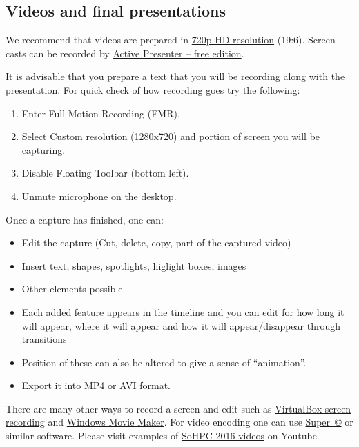 \documentclass[a4paper, twoside]{article}
\begin{document}
\begin{multicols}{3}
\section*{Videos and final presentations}
We recommend that videos are prepared in \href{https://support.google.com/youtube/answer/1722171}{720p HD resolution} (19:6). Screen casts can be recorded by \href{http://atomisystems.com/activepresenter/free-edition/}{Active Presenter --  free edition}.

It is advisable that you prepare a text that you will be recording along with the presentation.\vspace{50mm} For quick check of how recording goes try the following:
\begin{enumerate}
 \setlength{\itemsep}{0pt}\setlength{\parskip}{0pt}
 \item Enter Full Motion Recording (FMR).
 \item Select Custom resolution (1280x720) and portion of screen you will be capturing.
\item Disable Floating Toolbar (bottom left).
\item Unmute microphone on the desktop.
\end{enumerate}
Once a capture has finished, one can:
\begin{itemize}
  \item Edit the capture (Cut, delete, copy, part of the captured video)
  \item Insert text, shapes, spotlights, higlight boxes, images
  \item Other elements possible.
  \item Each added feature appears in the timeline and you can edit for how long it will appear, where it will appear and how it will appear/disappear through transitions
  \item Position of these can also be altered to give a sense of ``animation''.
  \item Export it into MP4 or AVI format.
\end{itemize}
There are many other ways to record a screen and edit such as \href{http://geekthis.net/blog/98/virtualbox-video-capture}{VirtualBox screen recording} and \href{https://youtu.be/WDh1CrL2344}{Windows Movie Maker}. For video encoding one can use \href{http://www.erightsoft.com/SUPER.html}{Super~\copyright} or similar software. Please visit examples of \href{https://www.youtube.com/playlist?list=PLhpKvYInDmFWy66381nifGkCJBLb6iwGf}{SoHPC 2016 videos} on Youtube.



\end{multicols}
\end{document}
